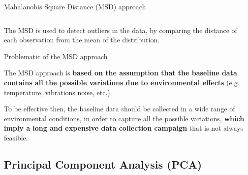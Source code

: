 \begin{frame}{Mahalanobis Square Distance (MSD) approach}
\begin{columns}[c, onlytextwidth]
\begin{column}{0.45\textwidth}
        \end{column}

    \end{columns}

    \vspace{9pt}

    The MSD is used to detect outliers in the data, by comparing the distance of each observation from the mean of the distribution.

\end{frame}



\begin{frame}{Problematic of the MSD approach}

    The MSD approach is \textbf{based on the assumption that the baseline data contains all the possible variations due to environmental effects} (e.g. temperature, vibrations noise, etc.).

    \vspace{9pt}

    To be effective then, the baseline data should be collected in a wide range of environmental conditions, in order to capture all the possible variations, \textbf{which imply a long and expensive data collection campaign} that is not always feasible.

\end{frame}



\subsection{Principal Component Analysis (PCA)}

